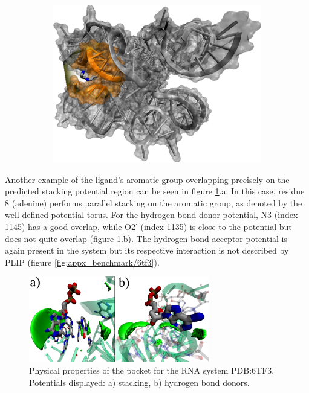       \begin{figure}[H] \centering
        \begin{subfigure}[c]{0.3\textwidth} \centering
          \includegraphics[width=1\textwidth]{figures/results/ps_rna/7oax0.png}
        \end{subfigure}
        \begin{subfigure}[c]{0.3\textwidth} \centering
        \end{subfigure}
      \end{figure}

      Another example of the ligand's aromatic group overlapping precisely on the predicted stacking potential region can be seen in figure \ref{fig:benchmark/6tf3}.a. In this case, residue 8 (adenine) performs parallel stacking on the aromatic group, as denoted by the well defined potential torus. For the hydrogen bond donor potential, N3 (index 1145) has a good overlap, while O2' (index 1135) is close to the potential but does not quite overlap (figure \ref{fig:benchmark/6tf3}.b). The hydrogen bond acceptor potential is again present in the system but its respective interaction is not described by PLIP (figure \ref{fig:appx_benchmark/6tf3}).

      \begin{figure}[H]
        \centering
        \includegraphics[width=0.7\textwidth]{figures/results/benchmark_rna/6tf3.png}
        \caption{\label{fig:benchmark/6tf3} Physical properties of the pocket for the RNA system PDB:6TF3. Potentials displayed: a) stacking, b) hydrogen bond donors.}
      \end{figure}
    \pagebreak

